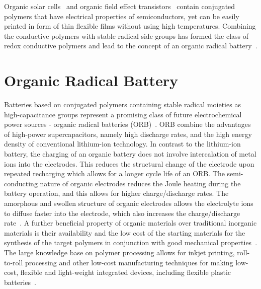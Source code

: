 \par

Organic solar cells~\cite{Lee_1993} and organic field effect transistors~\cite{Koezuka_1987} contain conjugated polymers that have electrical properties of semiconductors, yet can be easily printed in form of thin flexible films without using high temperatures. Combining the conductive polymers with stable radical side groups has formed the class of redox conductive polymers and lead to the concept of an organic radical battery~\cite{Rohland_2021}.




\section{Organic Radical Battery}

Batteries based on conjugated polymers containing stable radical moieties as high-capacitance groups represent a promising class of future electrochemical power sources - organic radical batteries (ORB)~\cite{nakahara2002_cpl, nishide2004_electact,xie2021_mathoriz,Rohland_2021}. ORB combine the advantages of high-power supercapacitors, namely high discharge rates, and the high energy density of conventional lithium-ion technology. In contrast to the lithium-ion battery, the charging of an organic battery does not involve intercalation of metal ions into the electrodes. This reduces the structural change of the electrode upon repeated recharging which allows for a longer cycle life of an ORB. The semi-conducting nature of organic electrodes reduces the Joule heating during the battery operation, and this allows for higher charge/discharge rates. The amorphous and swollen structure of organic electrodes allows the electrolyte ions to diffuse faster into the electrode, which also increases the charge/discharge rate~\cite{nishide_2009}. A further beneficial property of organic materials over traditional inorganic materials is their availability and the low cost of the starting materials for the synthesis of the target polymers in conjunction with good mechanical properties~\cite{janoschka2012_advmater, muench2016_chemrev, friebe2017_topcurrchem}. The large knowledge base on polymer processing allows for inkjet printing, roll-to-roll processing and other low-cost manufacturing techniques for making low-cost, flexible and light-weight integrated devices, including flexible plastic batteries~\cite{janoschka2012_advmater,nishide_2009}. 

